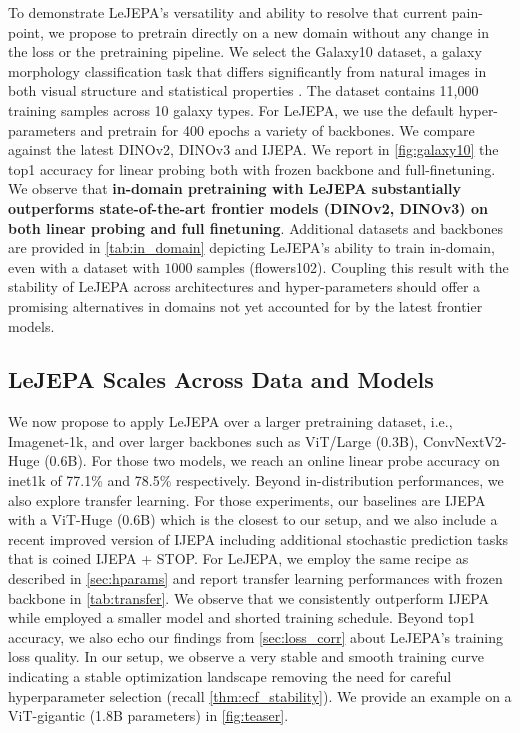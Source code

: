 To demonstrate LeJEPA's versatility and ability to resolve that current pain-point, we propose to pretrain directly on a new domain without any change in the loss or the pretraining pipeline. We select the Galaxy10 dataset, a galaxy morphology classification task that differs significantly from natural images in both visual structure and statistical properties \citep{balestriero2025gaussian}. The dataset contains 11,000 training samples across 10 galaxy types. For LeJEPA, we use the default hyper-parameters and pretrain for 400 epochs a variety of backbones. We compare against the latest DINOv2, DINOv3 and IJEPA. We report in \cref{fig:galaxy10} the top1 accuracy for linear probing both with frozen backbone and full-finetuning. We observe that {\bf in-domain pretraining with LeJEPA substantially outperforms state-of-the-art frontier models (DINOv2, DINOv3) on both linear probing and full finetuning}. Additional datasets and backbones are provided in \cref{tab:in_domain} depicting LeJEPA's ability to train in-domain, even with a dataset with $1000$ samples (flowers102). Coupling this result with the stability of LeJEPA across architectures and hyper-parameters should offer a promising alternatives in domains not yet accounted for by the latest frontier models.


\subsection{LeJEPA Scales Across Data and Models}
\label{sec:scale}



We now propose to apply LeJEPA over a larger pretraining dataset, i.e., Imagenet-1k, and over larger backbones such as ViT/Large (0.3B), ConvNextV2-Huge (0.6B). For those two models, we reach an online linear probe accuracy on inet1k of 77.1\% and 78.5\%  respectively. Beyond in-distribution performances, we also explore transfer learning. For those experiments, our baselines are IJEPA with a ViT-Huge (0.6B) which is the closest to our setup, and we also include a recent improved version of IJEPA including additional stochastic prediction tasks \citep{bar2023stochastic} that is coined IJEPA + STOP. For LeJEPA, we employ the same recipe as described in \cref{sec:hparams} and report transfer learning performances with frozen backbone in \cref{tab:transfer}. We observe that we consistently outperform IJEPA while employed a smaller model and shorted training schedule. Beyond top1 accuracy, we also echo our findings from \cref{sec:loss_corr} about LeJEPA's training loss quality. In our setup, we observe a very stable and smooth training curve indicating a stable optimization landscape removing the need for careful hyperparameter selection (recall \cref{thm:ecf_stability}). We provide an example on a ViT-gigantic (1.8B parameters) in \cref{fig:teaser}.



